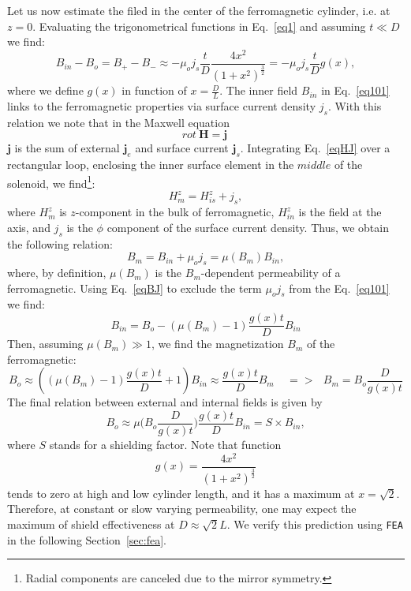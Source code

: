\documentclass[12pt]{article}
\begin{document}
Let us now estimate the filed in the center of the ferromagnetic cylinder, i.e. at $z=0$.
Evaluating the trigonometrical functions in  Eq.~\ref{eq1} and assuming  $t \ll D$ we find:
\begin{equation}
B_{in}-B_o = B_+ - B_- \approx - \mu_o j_s  \frac{t}{D} \frac{4x^2} {(1+x^2)^{\frac{3}{2}}}
= - \mu_o j_s \frac{t}{D} g(x),
\label{eq101}
\end{equation}
where we define  $g(x)$ in  function of  $x=\frac{D}{L}$.
%
The inner field $B_{in}$ in  Eq.~\ref{eq101} 
links to the  ferromagnetic properties 
via surface current density  $j_s$. With this 
relation we note that in  the Maxwell equation
\begin{equation}
rot~\textbf{H} = \textbf{j}~
\label{eqHJ}
\end{equation}
$\textbf{j}$ is the sum of external $\textbf{j}_e$  and surface   current $\textbf{j}_s$.
Integrating Eq.~\ref{eqHJ} over a rectangular loop, enclosing the inner surface element 
in the $middle$ of the solenoid, we find\footnote{Radial components are canceled due to 
the mirror symmetry.}:
%
\begin{equation}
                  H_m^z =H_{is}^z+j_s,
\label{eqBJ1}
\end{equation}
%
where $H_m^z$ is   $z$-component  in the bulk of   ferromagnetic,
$H_{in}^z$ is the field at the  axis, and
$j_s$ is the $\phi$ component of the surface current density.
Thus,  we obtain the following  relation:
%
\begin{equation}
B_m = B_{in}+\mu_o j_s=\mu(B_m)B_{in},  
\label{eqBJ}
\end{equation}
%
where, by definition,  $\mu(B_m)$ is the $B_m$-dependent  permeability  of a  ferromagnetic.
Using  Eq.~\ref{eqBJ}  to exclude  the term 
$\mu_o j_s$ from the Eq.~\ref{eq101} we find:
%
\begin{equation}
B_{in}=B_o - (\mu(B_m)-1)\frac{g(x)t}{D}  B_{in}
\label{eq11}
\end{equation}
%
Then, assuming  $\mu(B_m)\gg1$, we find the magnetization $B_m$ of the ferromagnetic:
%
\begin{equation}
B_{o}\approx
((\mu(B_m)-1)\frac{g(x)t}{D}+1) B_{in}\approx
\frac{g(x)t}{D}B_{m}~~~ ~~ => ~~~B_{m}=B_o\frac{D}{g(x)t}
\label{eq12}
\end{equation}
%
The final relation between external and internal fields is given by
%
\begin{equation}
B_o \approx \mu\bigg(B_o 
\frac{D}{g(x)t}\bigg) \frac{g(x)t }{D} B_{in}=S \times B_{in} ,
\label{eqfinal}
\end{equation}
%
where $S$ stands for a shielding factor.
Note that  function
%
\begin{equation}
 g(x)=\frac{4x^2}{(1+x^2)^{\frac{3}{2}}}
\label{eq:sf01}
\end{equation}
tends to zero at high and low cylinder length, and it  
has a maximum at $x=\sqrt2$. Therefore, at constant or slow varying  permeability, 
one may  expect the maximum of shield
effectiveness at $D \approx \sqrt2L$. 
We  verify this prediction  using  {\tt FEA}  in the following  Section~\ref{sec:fea}.
\end{document}
